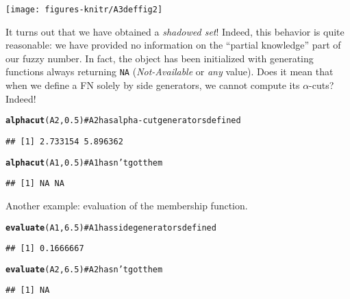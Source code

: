 \documentclass[11pt]{article}\usepackage{graphicx, color}
\makeatletter
\newcommand{\hlfunctioncall}[1]{\textcolor[rgb]{0.501960784313725,0,0.329411764705882}{\textbf{#1}}}%
\newcommand{\hlcomment}[1]{\textcolor[rgb]{0.180392156862745,0.6,0.341176470588235}{#1}}%
\newenvironment{kframe}{%
 \def\at@end@of@kframe{}%
 \ifinner\ifhmode%
  \def\at@end@of@kframe{\end{minipage}}%
  \begin{minipage}{\columnwidth}%
 \fi\fi%
 \def\FrameCommand##1{\hskip\@totalleftmargin \hskip-\fboxsep
 \colorbox{shadecolor}{##1}\hskip-\fboxsep
     \hskip-\linewidth \hskip-\@totalleftmargin \hskip\columnwidth}%
 \MakeFramed {\advance\hsize-\width
   \@totalleftmargin\z@ \linewidth\hsize
   \@setminipage}}%
 {\par\unskip\endMakeFramed%
 \at@end@of@kframe}
\newenvironment{knitrout}{}{} %
\makeatother
\begin{document}
\begin{center}
\begin{knitrout}\small
{}\color{fgcolor}

{\centering \texttt{[image: figures-knitr/A3deffig2]} 

}



\end{knitrout}

\end{center}

\noindent
It turns out that we have obtained a \textit{shadowed set}!
Indeed, this behavior is quite reasonable: we have provided no information
on the ``partial knowledge'' part of our fuzzy number.
In fact, the object has been initialized
with generating functions always returning \texttt{NA}
(\textit{Not-Available} or \textit{any} value).
Does it mean that when we define a FN solely by side generators, we
cannot compute its $\alpha$-cuts? Indeed!

\begin{knitrout}\small
{}\color{fgcolor}\begin{kframe}
\begin{alltt}
\hlfunctioncall{alphacut}(A2, 0.5) \hlcomment{# A2 has alpha-cut generators defined}
\end{alltt}
\begin{verbatim}
## [1] 2.733154 5.896362
\end{verbatim}
\begin{alltt}
\hlfunctioncall{alphacut}(A1, 0.5) \hlcomment{# A1 hasn't got them}
\end{alltt}
\begin{verbatim}
## [1] NA NA
\end{verbatim}
\end{kframe}
\end{knitrout}


\noindent
Another example: evaluation of the membership function.

\begin{knitrout}\small
{}\color{fgcolor}\begin{kframe}
\begin{alltt}
\hlfunctioncall{evaluate}(A1, 6.5) \hlcomment{# A1 has side generators defined}
\end{alltt}
\begin{verbatim}
## [1] 0.1666667
\end{verbatim}
\begin{alltt}
\hlfunctioncall{evaluate}(A2, 6.5) \hlcomment{# A2 hasn't got them}
\end{alltt}
\begin{verbatim}
## [1] NA
\end{verbatim}
\end{kframe}
\end{knitrout}
\end{document}
